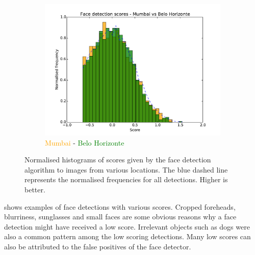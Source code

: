 \begin{figure}
\begin{subfigure}[b]{0.49\textwidth}
      \includegraphics[width=\textwidth]{figures/results/scores_hist_Mumbai_Belo_Horizonte}
      \caption{\textcolor{orange}{Mumbai} - \textcolor{green}{Belo Horizonte}}
    \end{subfigure}
\caption{Normalised histograms of scores given by the face detection algorithm
to images from various locations. The blue dashed line represents the
normalised frequencies for all detections. Higher is better.}
\label{fig:results:fd:scores_hist}
\end{figure}

 shows examples of face detections with various
scores. Cropped foreheads, blurriness, sunglasses and small faces are some
obvious reasons why a face detection might have received a low score.
Irrelevant objects such as dogs were also a common pattern among the low
scoring detections. Many low scores can also be attributed to the false
positives of the face detector.



